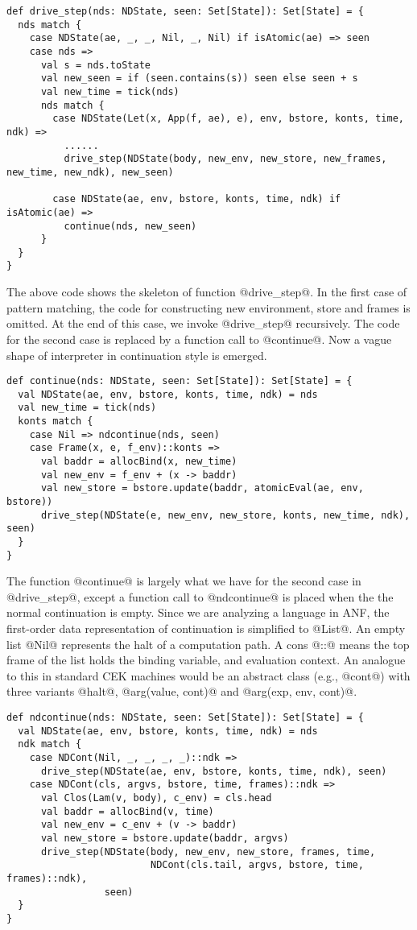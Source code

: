 \documentclass[acmsmall,review,anonymous]{acmart}\settopmatter{printfolios=true,printccs=false,printacmref=false}
\begin{document}
\begin{lstlisting}
def drive_step(nds: NDState, seen: Set[State]): Set[State] = {
  nds match {
    case NDState(ae, _, _, Nil, _, Nil) if isAtomic(ae) => seen
    case nds =>
      val s = nds.toState
      val new_seen = if (seen.contains(s)) seen else seen + s
      val new_time = tick(nds)
      nds match {
        case NDState(Let(x, App(f, ae), e), env, bstore, konts, time, ndk) =>
          ......
          drive_step(NDState(body, new_env, new_store, new_frames, new_time, new_ndk), new_seen)

        case NDState(ae, env, bstore, konts, time, ndk) if isAtomic(ae) =>
          continue(nds, new_seen)
      }
  }
}
\end{lstlisting}

The above code shows the skeleton of function @drive_step@.
In the first case of pattern matching, the code for constructing new
environment, store and frames is omitted.
At the end of this case, we invoke @drive_step@ recursively.
The code for the second case is replaced by a function call to @continue@.
Now a vague shape of interpreter in continuation style is emerged.

\begin{lstlisting}
def continue(nds: NDState, seen: Set[State]): Set[State] = {
  val NDState(ae, env, bstore, konts, time, ndk) = nds
  val new_time = tick(nds)
  konts match {
    case Nil => ndcontinue(nds, seen)
    case Frame(x, e, f_env)::konts =>
      val baddr = allocBind(x, new_time)
      val new_env = f_env + (x -> baddr)
      val new_store = bstore.update(baddr, atomicEval(ae, env, bstore))
      drive_step(NDState(e, new_env, new_store, konts, new_time, ndk), seen)
  }
}
\end{lstlisting}

The function @continue@ is largely what we have for the second case in
@drive_step@, except a function call to @ndcontinue@ is placed when
the the normal continuation is empty.
Since we are analyzing a language in ANF, the first-order data representation of
continuation is simplified to @List@.
An empty list @Nil@ represents the halt of a computation path.
A cons @::@ means the top frame of the list holds the binding variable, and
evaluation context.
An analogue to this in standard CEK machines would be an abstract class (e.g., @cont@) with three
variants @halt@, @arg(value, cont)@ and @arg(exp, env, cont)@.

\begin{lstlisting}
def ndcontinue(nds: NDState, seen: Set[State]): Set[State] = {
  val NDState(ae, env, bstore, konts, time, ndk) = nds
  ndk match {
    case NDCont(Nil, _, _, _, _)::ndk =>
      drive_step(NDState(ae, env, bstore, konts, time, ndk), seen)
    case NDCont(cls, argvs, bstore, time, frames)::ndk =>
      val Clos(Lam(v, body), c_env) = cls.head
      val baddr = allocBind(v, time)
      val new_env = c_env + (v -> baddr)
      val new_store = bstore.update(baddr, argvs)
      drive_step(NDState(body, new_env, new_store, frames, time,
                         NDCont(cls.tail, argvs, bstore, time, frames)::ndk),
                 seen)
  }
}
\end{lstlisting}
\end{document}
